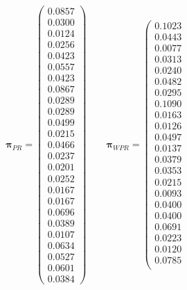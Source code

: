 \documentclass[11pt]{report}
\begin{document}
{\begin{appendices}
\begin{figure} [H]  
\begin{equation} 
\boldsymbol\pi_{PR} = \left(
\begin{array}{c}
0.0857\\
0.0300\\
0.0124\\
0.0256\\
0.0423\\
0.0557\\
0.0423\\
0.0867\\
0.0289\\
0.0289\\
0.0499\\
0.0215\\
0.0466\\
0.0237\\
0.0201\\
0.0252\\
0.0167\\
0.0167\\
0.0696\\
0.0389\\
0.0107\\
0.0634\\
0.0527\\
0.0601\\
0.0384
\end{array}
\right) \qquad 
\boldsymbol\pi_{WPR} = \left(
\begin{array}{c}
0.1023 \\
0.0443 \\
0.0077 \\
0.0313 \\
0.0240 \\
0.0482 \\
0.0295 \\
0.1090 \\
0.0163 \\
0.0126 \\
0.0497 \\
0.0137 \\
0.0379 \\
0.0353 \\
0.0215 \\
0.0093 \\
0.0400 \\
0.0400 \\
0.0691 \\
0.0223 \\
0.0120 \\
0.0785 \\

\end{array}
\end{equation}
\end{figure}
\end{appendices}}
\end{document}
